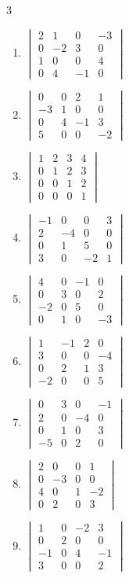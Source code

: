 \begin{multicols}{3}
\begin{enumerate}[label=\arabic*.,  leftmargin=*]
\item $\begin{vmatrix}2&1&0&-3\\0&-2&3&0\\1&0&0&4\\0&4&-1&0\end{vmatrix}$
\item $\begin{vmatrix}0&0&2&1\\-3&1&0&0\\0&4&-1&3\\5&0&0&-2\end{vmatrix}$
\item $\begin{vmatrix}1&2&3&4\\0&1&2&3\\0&0&1&2\\0&0&0&1\end{vmatrix}$
\item $\begin{vmatrix}-1&0&0&3\\2&-4&0&0\\0&1&5&0\\3&0&-2&1\end{vmatrix}$
\item $\begin{vmatrix}4&0&-1&0\\0&3&0&2\\-2&0&5&0\\0&1&0&-3\end{vmatrix}$
\item $\begin{vmatrix}1&-1&2&0\\3&0&0&-4\\0&2&1&3\\-2&0&0&5\end{vmatrix}$
\item $\begin{vmatrix}0&3&0&-1\\2&0&-4&0\\0&1&0&3\\-5&0&2&0\end{vmatrix}$
\item $\begin{vmatrix}2&0&0&1\\0&-3&0&0\\4&0&1&-2\\0&2&0&3\end{vmatrix}$
\item $\begin{vmatrix}1&0&-2&3\\0&2&0&0\\-1&0&4&-1\\3&0&0&2\end{vmatrix}$

\end{enumerate}
\end{multicols}

